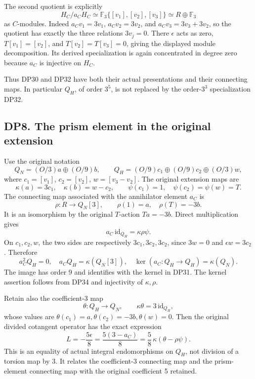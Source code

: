 \documentclass[
  10pt,
  a4paper,
]{article}
\begin{document}
The second quotient is explicitly \[
H_C/a_CH_C\simeq\mathbb F_3\{[v_1],[v_2],[v_3]\}
\simeq R\oplus\mathbb F_3
\tag{DP32}
\] as \(C\)-modules. Indeed \(a_Cv_1=3v_1\), \(a_Cv_2=3v_2\), and
\(a_Cv_3=3v_3+3v_2\), so the quotient has exactly the three relations
\(3v_j=0\). There \(\epsilon\) acts as zero, \(T[v_1]=[v_2]\), and
\(T[v_2]=T[v_3]=0\), giving the displayed module decomposition. Its
derived specialization is again concentrated in degree zero because
\(a_C\) is injective on \(H_C\).

Thus DP30 and DP32 have both their actual presentations and their
connecting maps. In particular \(Q_H\), of order \(3^5\), is not
replaced by the order-\(3^3\) specialization DP32.

\subsection{DP8. The prism element in the original
extension}\label{dp8.-the-prism-element-in-the-original-extension}

Use the original notation \[
Q_N=(O/3)a\oplus(O/9)b,\qquad
Q_H=(O/9)c_1\oplus(O/9)c_2\oplus(O/3)w,
\] where \(c_1=[v_1]\), \(c_2=[v_2]\), \(w=[v_3-v_2]\). The original
extension maps are \[
\kappa(a)=3c_1,\quad\kappa(b)=w-c_2,\qquad
\psi(c_1)=1,\quad\psi(c_2)=\psi(w)=T.
\tag{DP33}
\] The connecting map associated with the annihilator element \(a_C\) is
\[
\rho:R\to Q_N[3],\qquad
\rho(1)=a,\quad\rho(T)=-3b.
\] It is an isomorphism by the original \(T\)-action \(Ta=-3b\). Direct
multiplication gives \[
\boxed{a_C\,\mathrm{id}_{Q_H}=\kappa\rho\psi.}
\tag{DP34}
\] On \(c_1,c_2,w\), the two sides are respectively \(3c_1,3c_2,3c_2\),
since \(3w=0\) and \(\epsilon w=3c_2\). Therefore \[
a_C^2Q_H=0,\quad
a_CQ_H=\kappa(Q_N[3]),\quad
\ker(a_C:Q_H\to Q_H)=\kappa(Q_N).
\tag{DP35}
\] The image has order 9 and identifies with the kernel in DP31. The
kernel assertion follows from DP34 and injectivity of \(\kappa,\rho\).

Retain also the coefficient-3 map \[
\theta:Q_H\to Q_N,\qquad
\kappa\theta=3\,\mathrm{id}_{Q_H},
\] whose values are \(\theta(c_1)=a,\theta(c_2)=-3b,\theta(w)=0\). Then
the original divided cotangent operator has the exact expression \[
L=-\frac{5\epsilon}{8}
=\frac{5(3-a_C)}8
=\frac58\,\kappa(\theta-\rho\psi).
\tag{DP36}
\] This is an equality of actual integral endomorphisms on \(Q_H\), not
division of a torsion map by 3. It relates the coefficient-3 connecting
map and the prism-element connecting map with the original coefficient 5
retained.
\end{document}
